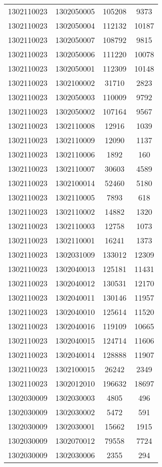 \begin{longtable}[h]{llcc}
		1302110023 & 1302050005 & 105208 & 9373\\
		1302110023 & 1302050004 & 112132 & 10187\\
		1302110023 & 1302050007 & 108792 & 9815\\
		1302110023 & 1302050006 & 111220 & 10078\\
		1302110023 & 1302050001 & 112309 & 10148\\
		1302110023 & 1302100002 & 31710 & 2823\\
		1302110023 & 1302050003 & 110009 & 9792\\
		1302110023 & 1302050002 & 107164 & 9567\\
		1302110023 & 1302110008 & 12916 & 1039\\
		1302110023 & 1302110009 & 12090 & 1137\\
		1302110023 & 1302110006 & 1892 & 160\\
		1302110023 & 1302110007 & 30603 & 4589\\
		1302110023 & 1302100014 & 52460 & 5180\\
		1302110023 & 1302110005 & 7893 & 618\\
		1302110023 & 1302110002 & 14882 & 1320\\
		1302110023 & 1302110003 & 12758 & 1073\\
		1302110023 & 1302110001 & 16241 & 1373\\
		1302110023 & 1302031009 & 133012 & 12309\\
		1302110023 & 1302040013 & 125181 & 11431\\
		1302110023 & 1302040012 & 130531 & 12170\\
		1302110023 & 1302040011 & 130146 & 11957\\
		1302110023 & 1302040010 & 125614 & 11520\\
		1302110023 & 1302040016 & 119109 & 10665\\
		1302110023 & 1302040015 & 124714 & 11606\\
		1302110023 & 1302040014 & 128888 & 11907\\
		1302110023 & 1302100015 & 26242 & 2349\\
		1302110023 & 1302012010 & 196632 & 18697\\
		1302030009 & 1302030003 & 4805 & 496\\
		1302030009 & 1302030002 & 5472 & 591\\
		1302030009 & 1302030001 & 15662 & 1915\\
		1302030009 & 1302070012 & 79558 & 7724\\
		1302030009 & 1302030006 & 2355 & 294\\

\end{longtable}
